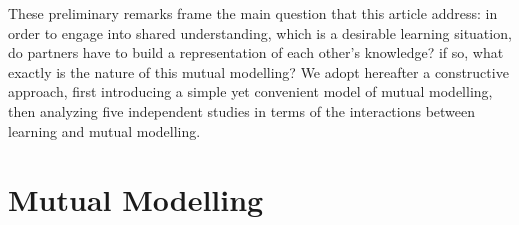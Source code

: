 \documentclass[natbib]{svjour3}
\begin{document}
%
%
%

\vspace{2em}
These preliminary remarks frame the main question that this article address:
in order to engage into shared understanding, which is a desirable learning
situation, do partners have to build a representation of each other's knowledge?
if so, what exactly is the nature of this mutual modelling? We adopt hereafter a
constructive approach, first introducing a simple yet convenient model of mutual
modelling, then analyzing five independent studies in terms of the interactions
between learning and mutual modelling.







\section{Mutual Modelling}
\end{document}
